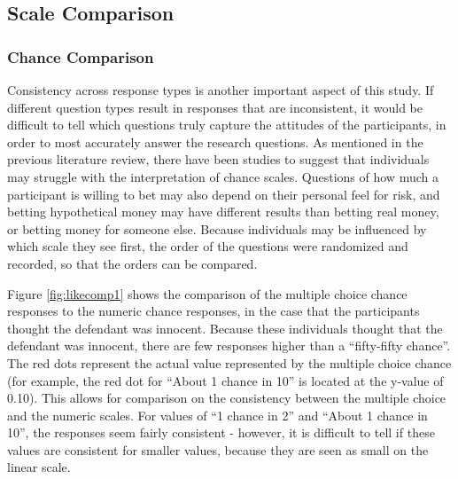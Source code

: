 \documentclass[print]{nuthesis}
\begin{document}
\hypertarget{scale-comparison}{%
\subsection{Scale Comparison}\label{scale-comparison}}

\hypertarget{chance-comparison}{%
\subsubsection{Chance Comparison}\label{chance-comparison}}

Consistency across response types is another important aspect of this study.
If different question types result in responses that are inconsistent, it would be difficult to tell which questions truly capture the attitudes of the participants, in order to most accurately answer the research questions.
As mentioned in the previous literature review, there have been studies to suggest that individuals may struggle with the interpretation of chance scales.
Questions of how much a participant is willing to bet may also depend on their personal feel for risk, and betting hypothetical money may have different results than betting real money, or betting money for someone else.
Because individuals may be influenced by which scale they see first, the order of the questions were randomized and recorded, so that the orders can be compared.

Figure \ref{fig:likecomp1} shows the comparison of the multiple choice chance responses to the numeric chance responses, in the case that the participants thought the defendant was innocent.
Because these individuals thought that the defendant was innocent, there are few responses higher than a ``fifty-fifty chance''.
The red dots represent the actual value represented by the multiple choice chance (for example, the red dot for ``About 1 chance in 10'' is located at the y-value of 0.10).
This allows for comparison on the consistency between the multiple choice and the numeric scales.
For values of ``1 chance in 2'' and ``About 1 chance in 10'', the responses seem fairly consistent - however, it is difficult to tell if these values are consistent for smaller values, because they are seen as small on the linear scale.
\end{document}
